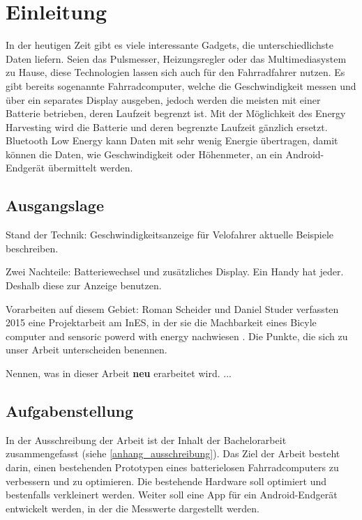 \chapter{Einleitung}
In der heutigen Zeit gibt es viele interessante Gadgets, die unterschiedlichste Daten liefern. Seien das Pulsmesser, Heizungsregler oder das Multimediasystem zu Hause, diese Technologien lassen sich auch für den Fahrradfahrer nutzen. Es gibt bereits sogenannte Fahrradcomputer, welche die Geschwindigkeit messen und über ein separates Display ausgeben, jedoch werden die meisten mit einer Batterie betrieben, deren Laufzeit begrenzt ist. Mit der Möglichkeit des Energy Harvesting wird die Batterie und deren begrenzte Laufzeit gänzlich ersetzt. Bluetooth Low Energy kann Daten mit sehr wenig Energie übertragen, damit können die Daten, wie Geschwindigkeit oder Höhenmeter, an ein Android-Endgerät übermittelt werden.


\section{Ausgangslage}

Stand der Technik: Geschwindigkeitsanzeige für Velofahrer aktuelle Beispiele beschreiben.

Zwei Nachteile: Batteriewechsel und zusätzliches Display. Ein Handy hat jeder. Deshalb diese zur Anzeige benutzen.



Vorarbeiten auf diesem Gebiet:
Roman Scheider und Daniel Studer verfassten 2015 eine Projektarbeit am InES, in der sie die Machbarkeit eines Bicyle computer and sensoric powerd with energy nachwiesen \cite{PA_bicycle}. 
Die Punkte, die sich zu unser Arbeit unterscheiden benennen.

Nennen, was in dieser Arbeit \textbf{neu} erarbeitet wird.
...



\section{Aufgabenstellung}
In der Ausschreibung der Arbeit ist der Inhalt der Bachelorarbeit zusammengefasst (siehe \ref{anhang_ausschreibung}). Das Ziel der Arbeit besteht darin, einen bestehenden Prototypen eines batterielosen Fahrradcomputers zu verbessern und zu optimieren. Die bestehende Hardware soll optimiert und bestenfalls verkleinert werden. Weiter soll eine App für ein Android-Endgerät entwickelt werden, in der die Messwerte dargestellt werden.

